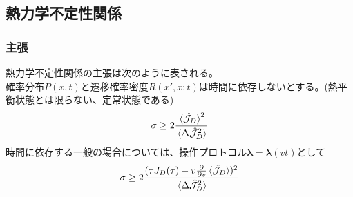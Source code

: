 \documentclass{ltjsarticle}
\begin{document}
\subsection{熱力学不定性関係}
\subsubsection{主張}
熱力学不定性関係の主張は次のように表される。\\
確率分布$P(x,t)$と遷移確率密度$R(x',x;t)$は時間に依存しないとする。(熱平衡状態とは限らない、定常状態である)
\begin{align}
  \sigma\ge 2\frac{\ev*{\hat{\mathcal{J}}_D}^2}{\ev*{\Delta\hat{\mathcal{J}}_D^2}}
  \label{eq:thermal_uncertain_steady}
\end{align}
時間に依存する一般の場合については、操作プロトコル$\bm{\lambda}=\bm{\lambda}(vt)$として
\begin{align}
  \sigma\ge 2\frac{(\tau J_D(\tau)-v\pdv{v}\ev*{\hat{\mathcal{J}}_D})^2}{\ev*{\Delta\hat{\mathcal{J}}_D^2}}
  \label{eq:thermal_uncertain_general}
\end{align}
\end{document}
